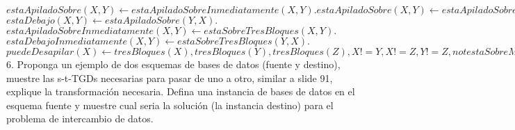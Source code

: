 $estaApiladoSobre(X, Y) \gets estaApiladoSobreInmediatamente(X, Y).
estaApiladoSobre(X, Y) \gets estaApiladoSobre(X, Z), estaApiladoSobre(Z, Y).$\\

$estaDebajo(X, Y) \gets estaApiladoSobre(Y, X).$\\

$estaApiladoSobreInmediatamente(X, Y) \gets estaSobreTresBloques(X, Y).$\\

$estaDebajoInmediatamente(X, Y) \gets estaSobreTresBloques(Y, X).$\\

$puedeDesapilar(X) \gets tresBloques(X), tresBloques(Y), tresBloques(Z), X != Y,  X != Z, Y != Z, not estaSobreMesa(X), not estaSobre(Y, X), not estaSobre(Z, X).$\\

6. Proponga un ejemplo de dos esquemas de bases de datos (fuente y destino), muestre las s-t-TGDs necesarias para pasar de uno a otro, similar a slide 91, explique la transformación necesaria. Defina una instancia de bases de datos en el esquema fuente y muestre cual seria la solución (la instancia destino) para el problema de intercambio de datos. \\

\bigskip